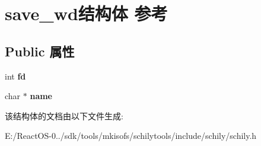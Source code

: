 \hypertarget{structsave__wd}{}\section{save\+\_\+wd结构体 参考}
\label{structsave__wd}
\subsection*{Public 属性}
\begin{DoxyCompactItemize}
\item 
\mbox{\label{structsave__wd_a6fef3a8d69940b2cc26627f8c8116eaf}} 
int {\bfseries fd}
\item 
\mbox{\label{structsave__wd_a0c7b384d76a401be4e55cffaa789f561}} 
char $\ast$ {\bfseries name}
\end{DoxyCompactItemize}


该结构体的文档由以下文件生成\+:\begin{DoxyCompactItemize}
\item 
E\+:/\+React\+O\+S-\/0../sdk/tools/mkisofs/schilytools/include/schily/schily.\+h\end{DoxyCompactItemize}
